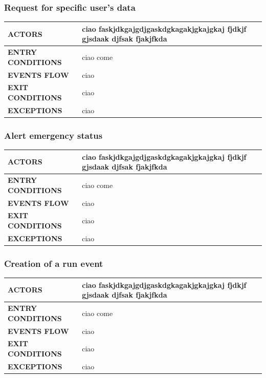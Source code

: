 \documentclass[a4paper]{article}
\begin{document}
    \subsubsection{Request for specific user's data}
    \begin{center}
        \begin{tabular}{l || p{8cm} ||}
            \bf{ACTORS} & ciao faskjdkgajgdjgaskdgkagakjgkajgkaj fjdkjf gjsdaak djfsak fjakjfkda \\ \hline
            \bf{ENTRY CONDITIONS} & ciao come  \\ \hline
            \bf{EVENTS FLOW} & ciao\\ \hline
            \bf{EXIT CONDITIONS} & ciao\\ \hline
            \bf{EXCEPTIONS} & ciao\\ \hline \hline
        \end{tabular}
    \end{center}
    
    \vspace{1cm}
    
    \subsubsection{Alert emergency status}
    \begin{center}
        \begin{tabular}{l || p{8cm} ||}
            \bf{ACTORS} & ciao faskjdkgajgdjgaskdgkagakjgkajgkaj fjdkjf gjsdaak djfsak fjakjfkda \\ \hline
            \bf{ENTRY CONDITIONS} & ciao come  \\ \hline
            \bf{EVENTS FLOW} & ciao\\ \hline
            \bf{EXIT CONDITIONS} & ciao\\ \hline
            \bf{EXCEPTIONS} & ciao\\ \hline \hline
        \end{tabular}
    \end{center}
    
    \vspace{1cm}
    
    \subsubsection{Creation of a run event}
    \begin{center}
        \begin{tabular}{l || p{8cm} ||}
            \bf{ACTORS} & ciao faskjdkgajgdjgaskdgkagakjgkajgkaj fjdkjf gjsdaak djfsak fjakjfkda \\ \hline
            \bf{ENTRY CONDITIONS} & ciao come  \\ \hline
            \bf{EVENTS FLOW} & ciao\\ \hline
            \bf{EXIT CONDITIONS} & ciao\\ \hline
            \bf{EXCEPTIONS} & ciao\\ \hline \hline
        \end{tabular}
    \end{center}
    
\end{document}
